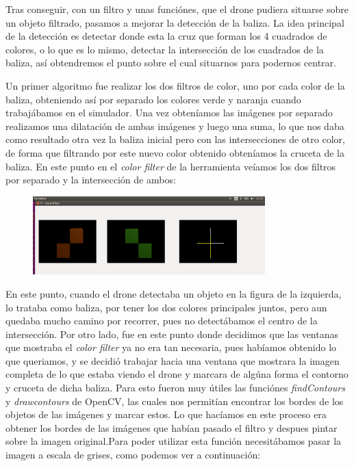 \hspace{1cm} Tras conseguir, con un filtro y unas funci\'ones, que el drone pudiera situarse sobre un objeto filtrado, pasamos a mejorar la detecci\'on de la baliza. La idea principal de la detecci\'on es detectar donde esta la cruz que forman los 4 cuadrados de colores, o lo que es lo mismo, detectar la intersecci\'on de los cuadrados de la baliza, as\'i obtendremos el punto sobre el cual situarnos para podernos centrar. 

\hspace{1cm} Un primer algoritmo fue realizar los dos filtros de color, uno por cada color de la baliza, obteniendo as\'i por separado los colores verde y naranja cuando trabaj\'abamos en el simulador. Una vez obten\'iamos las im\'agenes por separado realizamos una dilataci\'on de ambas im\'agenes y luego una suma, lo que nos daba como resultado otra vez la baliza inicial pero con las intersecciones de otro color, de forma que filtrando por este nuevo color obtenido obten\'iamos la cruceta de la baliza. En este punto en el \textit{color filter} de la herramienta ve\'iamos los dos filtros por separado y la intersecci\'on de ambos:

\begin{figure}[ht]
	\centering
		\includegraphics[width=0.8\textwidth]{imgs/E_Imagen_baliza.eps}
	\label{fig:E_Imagen_baliza}
\end{figure}

\hspace{1cm} En este punto, cuando el drone detectaba un objeto en la figura de la izquierda, lo trataba como baliza, por tener los dos colores principales juntos, pero aun quedaba mucho camino por recorrer, pues no detect\'abamos el centro de la intersecci\'on. Por otro lado, fue en este punto donde decidimos que las ventanas que mostraba el \textit{color filter} ya no era tan necesaria, pues hab\'iamos obtenido lo que queriamos, y se decidi\'o trabajar hacia una ventana que mostrara la imagen completa de lo que estaba viendo el drone y marcara de alg\'una forma el contorno y cruceta de dicha baliza. Para esto fueron muy \'utiles las funci\'ones \textit{findContours} y \textit{drawcontours} de OpenCV, las cuales nos permit\'ian encontrar los bordes de los objetos de las im\'agenes y marcar estos. Lo que hac\'iamos en este proceso era obtener los bordes de las im\'agenes que hab\'ian pasado el filtro y despues pintar sobre la imagen original.Para poder utilizar esta funci\'on necesit\'abamos pasar la imagen a escala de grises, como podemos ver a continuaci\'on:

